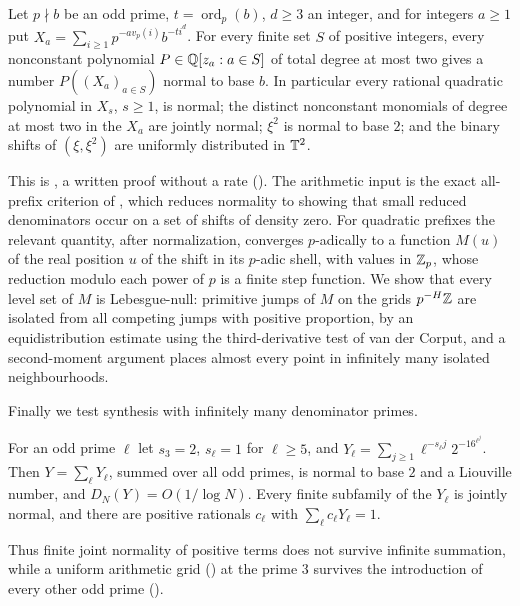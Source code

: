 \documentclass[11pt]{article}
\DeclareMathOperator{\ord}{ord}
\begin{document}
\begin{maintheorem}\label{thm:D}
Let $p\nmid b$ be an odd prime, $t=\ord_p(b)$, $d\ge3$ an integer, and for integers $a\ge1$ put
$X_a=\sum_{i\ge1}p^{-av_p(i)}b^{-ti^d}$. For every finite set $S$ of positive integers, every nonconstant
polynomial $P\in\mathbb Q[z_a:a\in S]$ of total degree at most two gives a number $P((X_a)_{a\in S})$ normal
to base $b$. In particular every rational quadratic polynomial in $X_s$, $s\ge1$, is normal; the
distinct nonconstant monomials of degree at most two in the $X_a$ are jointly normal; $\xi^2$ is normal
to base $2$; and the binary shifts of $(\xi,\xi^2)$ are uniformly distributed in $\mathbb T^2$.
\end{maintheorem}

This is , a written proof without a rate (). The arithmetic
input is the exact all-prefix criterion of , which reduces normality to showing
that small reduced denominators occur on a set of shifts of density zero. For quadratic prefixes the
relevant quantity, after normalization, converges $p$-adically to a function $M(u)$ of the real
position $u$ of the shift in its $p$-adic shell, with values in $\mathbb Z_p$, whose reduction modulo each
power of $p$ is a finite step function. We show that every level set of $M$ is Lebesgue-null:
primitive jumps of $M$ on the grids $p^{-H}\mathbb Z$ are isolated from all competing jumps with positive
proportion, by an equidistribution estimate using the third-derivative test of van der Corput, and a
second-moment argument places almost every point in infinitely many isolated neighbourhoods.

Finally we test synthesis with infinitely many denominator primes.

\begin{maintheorem}\label{thm:E}
For an odd prime $\ell$ let $s_3=2$, $s_\ell=1$ for $\ell\ge5$, and
$Y_\ell=\sum_{j\ge1}\ell^{-s_\ell j}2^{-16^{\ell^j}}$. Then $Y=\sum_\ell Y_\ell$, summed over all odd
primes, is normal to base $2$ and a Liouville number, and $D_N(Y)=O(1/\log N)$. Every finite
subfamily of the $Y_\ell$ is jointly normal, and there are positive rationals $c_\ell$ with
$\sum_\ell c_\ell Y_\ell=1$.
\end{maintheorem}

Thus finite joint normality of positive terms does not survive infinite summation, while a
uniform arithmetic grid () at the prime $3$ survives the introduction of every other
odd prime ().
\end{document}
